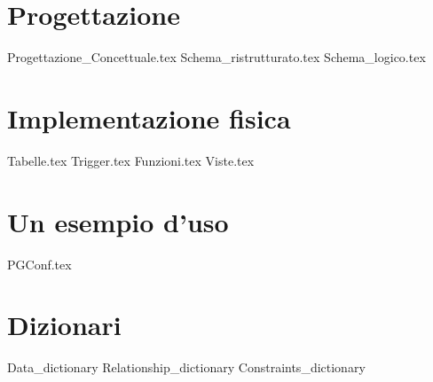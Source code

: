 \documentclass[a4paper,oneside, 11pt]{book}
\begin{document}
\chapter{Progettazione}
{Progettazione_Concettuale.tex}
{Schema_ristrutturato.tex}
{Schema_logico.tex}
\chapter{Implementazione fisica}
{Tabelle.tex}
{Trigger.tex}
{Funzioni.tex}
{Viste.tex}
\chapter{Un esempio d'uso}
{PGConf.tex}
\appendix
\chapter{Dizionari}
{Data_dictionary}
{Relationship_dictionary}
{Constraints_dictionary}
\end{document}
